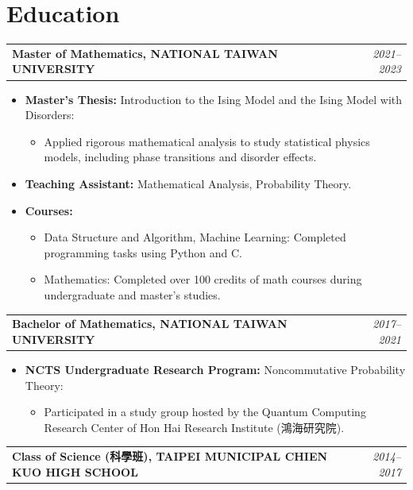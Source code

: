 \documentclass[a4paper,10pt]{article}
\begin{document}
\section*{Education}
\begin{tabularx}{\textwidth}{Xr}
    \textbf{Master of Mathematics, NATIONAL TAIWAN UNIVERSITY} & \textit{2021--2023} \\
\end{tabularx}
\begin{itemize}[leftmargin=30pt]
    \item \textbf{Master's Thesis:} Introduction to the Ising Model and the Ising Model with Disorders:
    \begin{itemize}
        \item Applied rigorous mathematical analysis to study statistical physics models, including phase transitions and disorder effects.
    \end{itemize}
    \item \textbf{Teaching Assistant:} Mathematical Analysis, Probability Theory.
    \item \textbf{Courses:}
    \begin{itemize}
        \item Data Structure and Algorithm, Machine Learning: Completed programming tasks using Python and C.
        \item Mathematics: Completed over 100 credits of math courses during undergraduate and master's studies.
    \end{itemize}
\end{itemize}

\noindent
\begin{tabularx}{\textwidth}{Xr}
    \textbf{Bachelor of Mathematics, NATIONAL TAIWAN UNIVERSITY} & \textit{2017--2021} \\
\end{tabularx}
\begin{itemize}[leftmargin=30pt]
    \item \textbf{NCTS Undergraduate Research Program:} Noncommutative Probability Theory:
    \begin{itemize}
        \item Participated in a study group hosted by the Quantum Computing Research Center of Hon Hai Research Institute (鴻海研究院).
    \end{itemize}
\end{itemize}

\noindent
\begin{tabularx}{\textwidth}{Xr}
    \textbf{Class of Science (科學班), TAIPEI MUNICIPAL CHIEN KUO HIGH SCHOOL} & \textit{2014--2017} \\
\end{tabularx}
\end{document}
